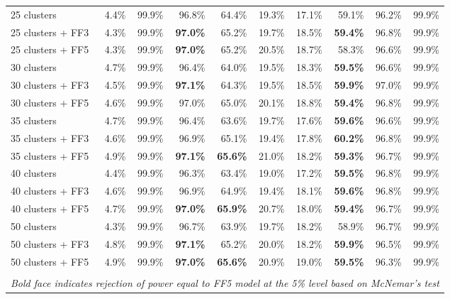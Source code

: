 \begin{table}[!h]
\begin{center}
\begin{tabular}{lrrrrrrrrr}
25 clusters	& 4.4\% & 99.9\% & 96.8\% & 64.4\% & 19.3\% & 17.1\% & 59.1\% & 96.2\% & 99.9\% \\
25 clusters + FF3	& 4.3\% & 99.9\% & \textbf{97.0\%} & 65.2\% & 19.7\% & 18.5\% & \textbf{59.4\%} & 96.8\% & 99.9\% \\
25 clusters + FF5	& 4.3\% & 99.9\% & \textbf{97.0\%} & 65.2\% & 20.5\% & 18.7\% & 58.3\% & 96.6\% & 99.9\% \\
30 clusters	& 4.7\% & 99.9\% & 96.4\% & 64.0\% & 19.5\% & 18.3\% & \textbf{59.5\%} & 96.6\% & 99.9\% \\
30 clusters + FF3	& 4.5\% & 99.9\% & \textbf{97.1\%} & 64.3\% & 19.5\% & 18.5\% & \textbf{59.9\%} & 97.0\% & 99.9\% \\
30 clusters + FF5	& 4.6\% & 99.9\% & 97.0\% & 65.0\% & 20.1\% & 18.8\% & \textbf{59.4\%} & 96.8\% & 99.9\% \\
35 clusters	& 4.7\% & 99.9\% & 96.4\% & 63.6\% & 19.7\% & 17.6\% & \textbf{59.6\%} & 96.6\% & 99.9\% \\
35 clusters + FF3	& 4.6\% & 99.9\% & 96.9\% & 65.1\% & 19.4\% & 17.8\% & \textbf{60.2\%} & 96.8\% & 99.9\% \\
35 clusters + FF5	& 4.9\% & 99.9\% & \textbf{97.1\%} & \textbf{65.6\%} & 21.0\% & 18.2\% & \textbf{59.3\%} & 96.7\% & 99.9\% \\
40 clusters	& 4.4\% & 99.9\% & 96.3\% & 63.4\% & 19.0\% & 17.2\% & \textbf{59.5\%} & 96.8\% & 99.9\% \\
40 clusters + FF3	& 4.6\% & 99.9\% & 96.9\% & 64.9\% & 19.4\% & 18.1\% & \textbf{59.6\%} & 96.8\% & 99.9\% \\
40 clusters + FF5	& 4.7\% & 99.9\% & \textbf{97.0\%} & \textbf{65.9\%} & 20.7\% & 18.0\% & \textbf{59.4\%} & 96.7\% & 99.9\% \\
50 clusters	& 4.3\% & 99.9\% & 96.7\% & 63.9\% & 19.7\% & 18.2\% & 58.9\% & 96.7\% & 99.9\% \\
50 clusters + FF3	& 4.8\% & 99.9\% & \textbf{97.1\%} & 65.2\% & 20.0\% & 18.2\% & \textbf{59.9\%} & 96.5\% & 99.9\% \\
50 clusters + FF5	& 4.9\% & 99.9\% & \textbf{97.0\%} & \textbf{65.6\%} & 20.9\% & 19.0\% & \textbf{59.5\%} & 96.3\% & 99.9\% \\
\hline\\
\multicolumn{10}{l}{\itshape Bold face indicates rejection of power equal to FF5 model at the 5\% level based on McNemar's test}
    \end{tabular}
    \end{center}
\end{table}
